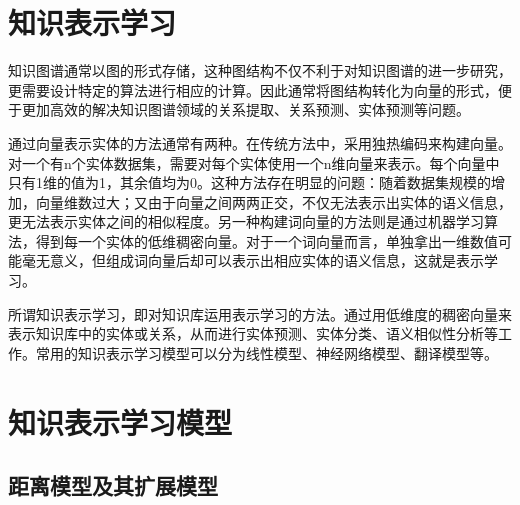 \documentclass{llncs}
\begin{document}

\section{知识表示学习}

知识图谱通常以图的形式存储，这种图结构不仅不利于对知识图谱的进一步研究，更需要设计特定的算法进行相应的计算。因此通常将图结构转化为向量的形式，便于更加高效的解决知识图谱领域的关系提取、关系预测、实体预测等问题。

通过向量表示实体的方法通常有两种。在传统方法中，采用独热编码来构建向量。对一个有n个实体数据集，需要对每个实体使用一个n维向量来表示。每个向量中只有1维的值为1，其余值均为0。这种方法存在明显的问题：随着数据集规模的增加，向量维数过大；又由于向量之间两两正交，不仅无法表示出实体的语义信息，更无法表示实体之间的相似程度。另一种构建词向量的方法则是通过机器学习算法，得到每一个实体的低维稠密向量。对于一个词向量而言，单独拿出一维数值可能毫无意义，但组成词向量后却可以表示出相应实体的语义信息，这就是表示学习。

所谓知识表示学习，即对知识库运用表示学习的方法。通过用低维度的稠密向量来表示知识库中的实体或关系，从而进行实体预测、实体分类、语义相似性分析等工作。常用的知识表示学习模型可以分为线性模型、神经网络模型、翻译模型等。

\section{知识表示学习模型}

\subsection{距离模型及其扩展模型}
\end{document}
